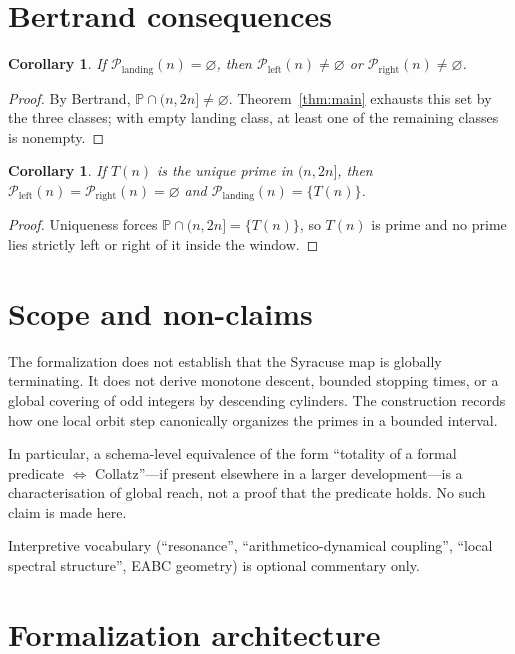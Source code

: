\documentclass[11pt,a4paper]{article}
\newtheorem{corollary}[theorem]{Corollary}
\theoremstyle{definition}
\theoremstyle{remark}
\newcommand{\TT}{T}
\newcommand{\Pleft}{\mathcal{P}_{\mathrm{left}}}
\newcommand{\Pland}{\mathcal{P}_{\mathrm{landing}}}
\newcommand{\Pright}{\mathcal{P}_{\mathrm{right}}}
\begin{document}
\section{Bertrand consequences}

\begin{corollary}
\label{cor:landing-empty}
If $\Pland(n)=\varnothing$, then
$\Pleft(n)\neq\varnothing$ or $\Pright(n)\neq\varnothing$.
\end{corollary}
\begin{proof}
By Bertrand, $\mathbb{P}\cap(n,2n]\neq\varnothing$. Theorem~\ref{thm:main}
exhausts this set by the three classes; with empty landing class, at least
one of the remaining classes is nonempty.
\end{proof}

\begin{corollary}
\label{cor:unique-landing}
If $\TT(n)$ is the unique prime in $(n,2n]$, then
$\Pleft(n)=\Pright(n)=\varnothing$ and $\Pland(n)=\{\TT(n)\}$.
\end{corollary}
\begin{proof}
Uniqueness forces $\mathbb{P}\cap(n,2n]=\{\TT(n)\}$, so $\TT(n)$ is prime
and no prime lies strictly left or right of it inside the window.
\end{proof}

\section{Scope and non-claims}

The formalization does not establish that the Syracuse map is globally
terminating. It does not derive monotone descent, bounded stopping times,
or a global covering of odd integers by descending cylinders. The
construction records how one local orbit step canonically organizes the
primes in a bounded interval.

In particular, a schema-level equivalence of the form
``totality of a formal predicate $\Leftrightarrow$ Collatz''---if present
elsewhere in a larger development---is a characterisation of global reach,
not a proof that the predicate holds. No such claim is made here.

Interpretive vocabulary (``resonance'', ``arithmetico-dynamical coupling'',
``local spectral structure'', EABC geometry) is optional commentary only.

\section{Formalization architecture}
\end{document}
